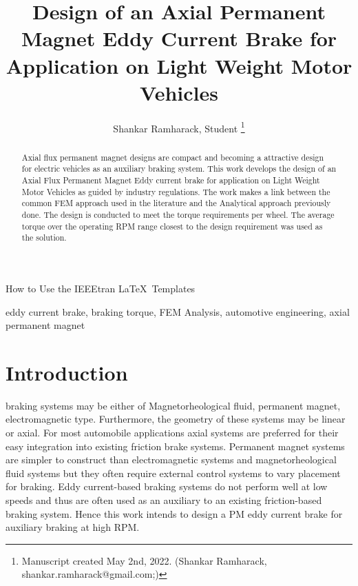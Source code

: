 \documentclass[lettersize,journal]{IEEEtran}
\begin{document}
\title{Design of an Axial Permanent Magnet Eddy Current Brake for Application on Light Weight Motor Vehicles}
\author{Shankar Ramharack, Student
\thanks{Manuscript created May 2nd, 2022. (Shankar Ramharack, shankar.ramharack@gmail.com;)}}

%
{How to Use the IEEEtran \LaTeX \ Templates}

\maketitle

\begin{abstract}
Axial flux permanent magnet designs are compact and becoming a attractive design for electric vehicles as an auxiliary braking system. This work develops the design of an Axial Flux Permanent Magnet Eddy current brake for application on Light Weight Motor Vehicles as guided by industry regulations. The work makes a link between the common FEM approach used in the literature and the Analytical approach previously done. The design is conducted to meet the torque requirements per wheel. The average torque over the operating RPM range closest to the design requirement was used as the solution.
\end{abstract}

\begin{IEEEkeywords}
eddy current brake, braking torque, FEM Analysis, automotive engineering, axial permanent magnet
\end{IEEEkeywords}

\section{Introduction}
 braking systems may be either of Magnetorheological fluid, permanent magnet, electromagnetic type. Furthermore, the geometry of these systems may be linear or axial. For most automobile applications axial systems are preferred for their easy integration into existing friction brake systems. Permanent magnet systems are simpler to construct than electromagnetic systems and magnetorheological fluid systems but they often require external control systems to vary placement for braking. Eddy current-based braking systems do not perform well at low speeds and thus are often used as an auxiliary to an existing friction-based braking system. Hence this work intends to design a PM eddy current brake for auxiliary braking at high RPM.
\end{document}
